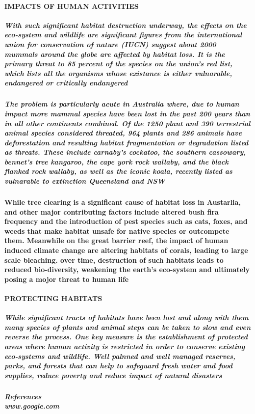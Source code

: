 \documentclass[10pt]{article}
\begin{document}
\paragraph{IMPACTS OF HUMAN ACTIVITIES }
\subparagraph{With such significant habitat destruction underway, the effects on the eco-system and wildlife are significant figures from the international union for conservation of nature (IUCN) suggest about 2000 mummals around the globe are affected by habitat loss. It is the primary threat to 85 percent of the species on the union's red list, which lists all the organisms whose existance is either vulnarable, endangered or critically endangered}
\subparagraph{The problem is particularly acute in Australia where, due to human impact more mammal species have been lost in the past 200 years than in all other continents combined. Of the 1250 plant and 390 terrestrial animal species considered threated, 964 plants and 286 animals have deforestation and resulting habitat fragmentation or degradation listed as threats. These include carnaby's cockatoo, the southern cassowary, bennet's tree kangaroo, the cape york rock wallaby, and the black flanked rock wallaby, as well as the iconic koala, recently listed as vulnarable to extinction Queensland and NSW }
\paragraph{While tree clearing is a significant cause of habitat loss in Austarlia, and other major contributing factors include altered bush fira frequency and the introduction of pest species such as cats, foxes, and weeds that make habitat unsafe for native species or outcompete them. Meanwhile on the great barrier reef, the impact of human induced climate change are altering habitats of corals, leading to large scale bleaching. over time, destruction of such habitats leads to reduced bio-diversity, weakening the earth's eco-system and ultimately posing a mojor threat to human life}
\paragraph{PROTECTING HABITATS} \subparagraph{While significant tracts of habitats have been lost and along with them many species of plants and animal steps can be taken to slow and even reverse the process. One key measure is the establishment of protected areas where human activity is restricted in order to conserve existing eco-systems and wildlife. Well palnned and well managed reserves, parks, and forests that can help to safeguard fresh water and food supplies, reduce poverty and reduce impact of natural disasters}
\subparagraph{References
\\www.google.com
}
\end{document}
